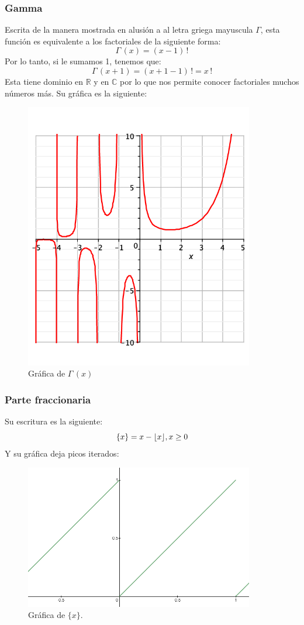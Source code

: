 \documentclass[letterpaper, 12pt]{article}
\DeclarePairedDelimiter\floor{\lfloor}{\rfloor}
\begin{document}
        \subsubsection{Gamma}
        Escrita de la manera mostrada en alusión a al letra griega mayuscula \(\Gamma\), esta función es equivalente a los factoriales de la siguiente forma:
        \[\Gamma\,(x)=(x-1)\,!\]
        Por lo tanto, si le sumamos 1, tenemos que:
        \[\Gamma\,(x+1)=(x+1-1)\,!=x\,!\]
        Esta tiene dominio en \(\mathbb{R}\) y en \(\mathbb{C}\) por lo que nos permite conocer factoriales muchos números más. Su gráfica es la siguiente:
        \begin{figure}[H]
            \centering
            \includegraphics[width=10cm]{gammax.png}
            \caption{Gráfica de \(\Gamma\,(x)\)}
        \end{figure}
        \subsubsection{Parte fraccionaria}
        Su escritura es la siguiente:
        \[\{x\}=x-\floor*{x} , x\geq 0\]
        Y su gráfica deja picos iterados:
        \begin{figure}
            \centering
            \includegraphics[width=10cm]{fracpartx.PNG}
            \caption{Gráfica de \(\{x\}\).}
        \end{figure}
\end{document}
